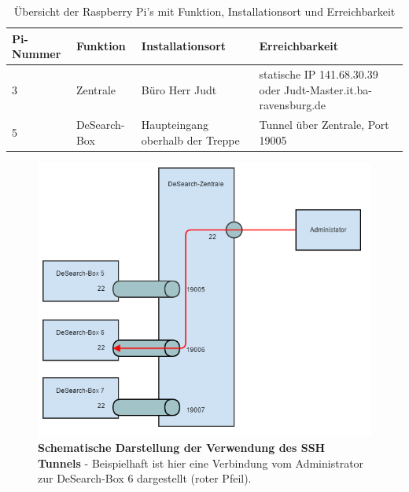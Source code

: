 \begin{table}[h]
	\begin{tabular}{ | p{} | p{} | p{4cm} | p{6cm} |}
		\hline
		\textbf{Pi-Nummer} & \textbf{Funktion} & \textbf{Installationsort} &  \textbf{Erreichbarkeit} \\ \hline
		3 & Zentrale & Büro Herr Judt & statische IP 141.68.30.39 oder \mbox{Judt-Master.it.ba-ravensburg.de} \\ \hline
		5 & DeSearch-Box & Haupteingang oberhalb der Treppe & Tunnel über Zentrale, Port 19005 \\ \hline
		
	\end{tabular}
	\caption{Übersicht der Raspberry Pi's mit Funktion, Installationsort und Erreichbarkeit}
	\label{tab:pis}
\end{table}

\begin{figure}
	\centering
	\includegraphics[width=\textwidth]{./images/tunnel.png}
	\caption[Schematische Darstellung der Verwendung des SSH Tunnels]{\textbf{Schematische Darstellung der Verwendung des SSH Tunnels} - Beispielhaft ist hier eine Verbindung vom Administrator zur DeSearch-Box 6 dargestellt (roter Pfeil).}
	\label{fig:tunnel}
\end{figure} 

